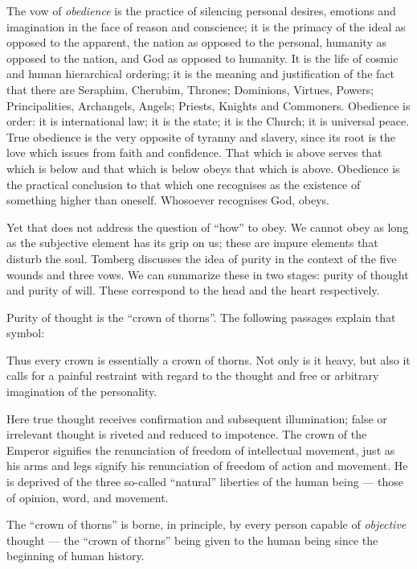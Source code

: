 \begin{quotationx}
The vow of \emph{obedience} is the practice of silencing personal desires, emotions and imagination in the face of
reason and conscience; it is the primacy of the ideal as opposed to the apparent, the nation as opposed to the
personal, humanity as opposed to the nation, and God as opposed to humanity. It is the life of cosmic and human
hierarchical ordering; it is the meaning and justification of the fact that there are Seraphim, Cherubim, Thrones;
Dominions, Virtues, Powers; Principalities, Archangels, Angels; Priests, Knights and Commoners. Obedience is order: it
is international law; it is the state; it is the Church; it is universal peace. True obedience is the very opposite of
tyranny and slavery, since its root is the love which issues from faith and confidence. That which is above serves that
which is below and that which is below obeys that which is above. Obedience is the practical conclusion to that which
one recognises as the existence of something higher than oneself. Whosoever recognises God, obeys. 

\end{quotationx}

Yet that does not address the question of “how” to obey. We cannot obey as long as the subjective element has its grip
on us; these are impure elements that disturb the soul. Tomberg discusses the idea of purity in the context of the five
wounds and three vows. We can summarize these in two stages: purity of thought and purity of will. These correspond to
the head and the heart respectively.

Purity of thought is the “crown of thorns”. The following passages explain that symbol:

\begin{quotationx}
Thus every crown is essentially a crown of thorns. Not only is it heavy, but also it calls for a painful restraint with
regard to the thought and free or arbitrary imagination of the personality.

Here true thought receives confirmation and subsequent illumination; false or irrelevant thought is riveted and reduced
to impotence. The crown of the Emperor signifies the renunciation of freedom of intellectual movement, just as his arms
and legs signify his renunciation of freedom of action and movement. He is deprived of the three so-called “natural”
liberties of the human being — those of opinion, word, and movement.

The “crown of thorns” is borne, in principle, by every person capable of \emph{objective} thought —
the “crown of thorns” being given to the human being since the beginning of human history. 

\end{quotationx}

